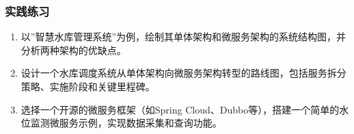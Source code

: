 \subsubsection{实践练习}\label{ux5b9eux8df5ux7ec3ux4e60}

\begin{enumerate}
\def\labelenumi{\arabic{enumi}.}
\item
  以''智慧水库管理系统''为例，绘制其单体架构和微服务架构的系统结构图，并分析两种架构的优缺点。
\item
  设计一个水库调度系统从单体架构向微服务架构转型的路线图，包括服务拆分策略、实施阶段和关键里程碑。
\item
  选择一个开源的微服务框架（如Spring
  Cloud、Dubbo等），搭建一个简单的水位监测微服务示例，实现数据采集和查询功能。
\end{enumerate}
